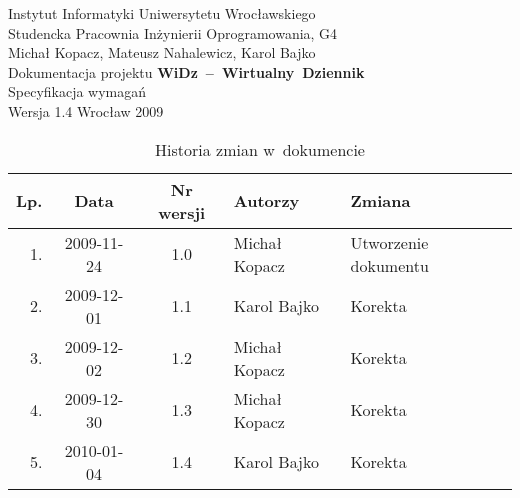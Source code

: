 \documentclass[12pt,leqno,twoside]{mwart}
\begin{document}
\begin{titlepage}
\begin{center}
Instytut Informatyki Uniwersytetu Wrocławskiego \\
Studencka Pracownia Inżynierii Oprogramowania, G4 \\
\vspace{4cm}
\Large Michał Kopacz, Mateusz Nahalewicz, Karol Bajko \\
\vspace{0.5cm}
\huge Dokumentacja projektu \mbox{\textbf{WiDz -- Wirtualny Dziennik}} \\ \Large Specyfikacja wymagań\\
\vspace{1cm}
\normalsize Wersja 1.4
\vfill
\normalsize Wrocław 2009
\end{center}
\end{titlepage}

\newpage

\begin{table}
	\centering
	\caption{Historia zmian w~dokumencie}
		\begin{tabular}{|r|c|c|l|l|}
		\hline
		Lp. 	& Data       & Nr wersji 	& Autorzy           		& Zmiana \\ \hline
		1.   	& 2009-11-24 & 1.0       	& Michał Kopacz & Utworzenie dokumentu \\ \hline
		2.	& 2009-12-01 & 1.1			& Karol Bajko & Korekta	\\ \hline
		3.	& 2009-12-02 & 1.2			& Michał Kopacz & Korekta	\\ \hline
		4.	& 2009-12-30 & 1.3			& Michał Kopacz & Korekta	\\ \hline
		5.	& 2010-01-04 & 1.4			& Karol Bajko	& Korekta	\\ \hline
		\end{tabular}
\end{table}

\newpage

\tableofcontents

\newpage
\end{document}
